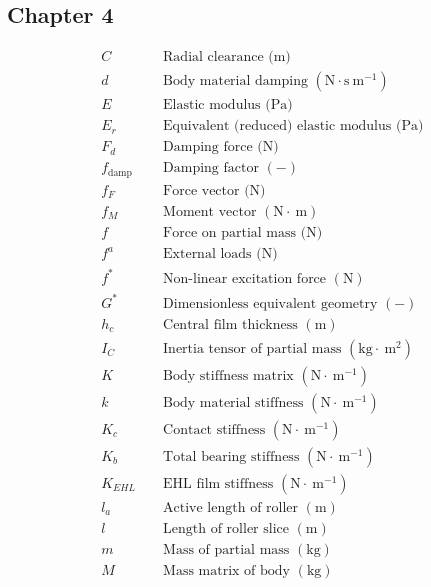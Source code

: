 \subsection*{Chapter 4}
\begin{align*}
	&C && \text { Radial clearance (m) } \\
	&d && \text { Body material damping }\left(\mathrm{N} \cdot \mathrm{s} \mathrm{~m}^{-1}\right) \\
	&E && \text { Elastic modulus (Pa) } \\
	&E_r && \text { Equivalent (reduced) elastic modulus (Pa) } \\
	&F_d && \text { Damping force (N) } \\
	&f_{\text {damp }} && \text { Damping factor }(-) \\
	&f_F && \text { Force vector (N) } \\
	&f_M && \text { Moment vector }(\mathrm{N} \cdot \mathrm{~m}) \\
	&f && \text { Force on partial mass (N) } \\
	&f^a && \text { External loads (N) } \\
	&f^* && \text { Non-linear excitation force }(\mathrm{N}) \\
	&G^* && \text { Dimensionless equivalent geometry }(-) \\
	&h_c && \text { Central film thickness }(\mathrm{m}) \\
	&I_C && \text { Inertia tensor of partial mass }\left(\mathrm{kg} \cdot \mathrm{~m}^2\right) \\
	&K && \text { Body stiffness matrix }\left(\mathrm{N} \cdot \mathrm{~m}^{-1}\right) \\
	&k && \text { Body material stiffness }\left(\mathrm{N} \cdot \mathrm{~m}^{-1}\right) \\
	&K_c && \text { Contact stiffness }\left(\mathrm{N} \cdot \mathrm{~m}^{-1}\right) \\
	&K_b && \text { Total bearing stiffness }\left(\mathrm{N} \cdot \mathrm{~m}^{-1}\right) \\
	&K_{E H L} && \text { EHL film stiffness }\left(\mathrm{N} \cdot \mathrm{~m}^{-1}\right) \\
	&l_a && \text { Active length of roller }(\mathrm{m}) \\
	&l && \text { Length of roller slice }(\mathrm{m}) \\
	&m && \text { Mass of partial mass }(\mathrm{kg}) \\
	&M && \text { Mass matrix of body }(\mathrm{kg}) \\

\end{align*}
